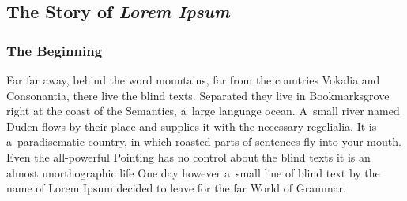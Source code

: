 \documentclass[12pt, a4paper, oneside]{article}
\theoremstyle{Plain}
\theoremstyle{Definition}
\theoremstyle{Remark}
\begin{document}
\subsection{The Story of \textit{Lorem Ipsum}}

\subsubsection{The Beginning}
\label{sec:tests:lorem-ipsum:beginning}
Far far away, behind the word mountains, far from the countries Vokalia and Consonantia, there live the blind texts. Separated they live in Bookmarksgrove right at the coast of the Semantics, a~large language ocean. A~small river named Duden flows by their place and supplies it with the necessary regelialia. It is a~paradisematic country, in which roasted parts of sentences fly into your mouth. Even the all-powerful Pointing has no control about the blind texts it is an almost unorthographic life One day however a~small line of blind text by the name of Lorem Ipsum decided to leave for the far World of Grammar.
\end{document}

